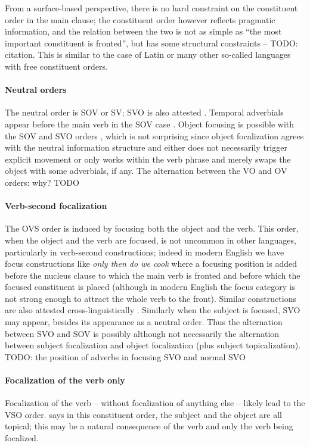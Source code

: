 \documentclass[a4paper, oneside, 12pt]{report}
\newcommand*{\citetable}[1]{Table~{#1}}
\newcommand*{\citepage}[1]{p.~{#1}}
\newcommand*{\citepages}[1]{pp.~{#1}}
\newcommand{\form}[1]{\emph{#1}}
\begin{document}
From a surface-based perspective, 
there is no hard constraint on the constituent order in the main clause;
the constituent order however reflects pragmatic information,
and the relation between the two is not as simple as 
``the most important constituent is fronted'',
but has some structural constraints -- TODO: citation.
This is similar to the case of Latin or many other so-called 
languages with free constituent orders.

\paragraph*{Neutral orders}
The neutral order is SOV or SV; SVO is also attested
\citep[\citetable{27.1}]{forker2020grammar}.
Temporal adverbials appear before the main verb in the SOV case 
\citep[\citepage{520}, (30)]{forker2020grammar}.
Object focusing is possible with the SOV and SVO orders
\citep[\citepages{520-521}]{forker2020grammar}, 
which is not surprising since object focalization agrees with the neutral information structure 
and either does not necessarily trigger explicit movement
or only works within the verb phrase and merely swaps the object with some adverbials, if any.
The alternation between the VO and OV orders: why? TODO

\paragraph*{Verb-second focalization}
The OVS order is induced by focusing both the object and the verb.
This order, when the object and the verb are focused, 
is not uncommon in other languages, particularly in verb-second constructions;
indeed in modern English we have focus constructions like 
\form{only then do we cook} 
where a focusing position is added before the nucleus clause 
to which the main verb is fronted and before which the focused constituent is placed
(although in modern English the focus category is not strong enough 
to attract the whole verb to the front).
Similar constructions are also attested cross-linguistically \citep[\citepage{521}]{forker2020grammar}.
Similarly when the subject is focused, SVO may appear, 
besides its appearance as a neutral order.
Thus the alternation between SVO and SOV is possibly although not necessarily 
the alternation between subject focalization and object focalization (plus subject topicalization).
TODO: the position of adverbs in focusing SVO and normal SVO

\paragraph*{Focalization of the verb only}
Focalization of the verb -- without focalization of anything else -- likely lead to the VSO order.
\citet[\citetable{27.1}]{forker2020grammar} says in this constituent order, 
the subject and the object are all topical; 
this may be a natural consequence of the verb and only the verb being focalized.
\end{document}
